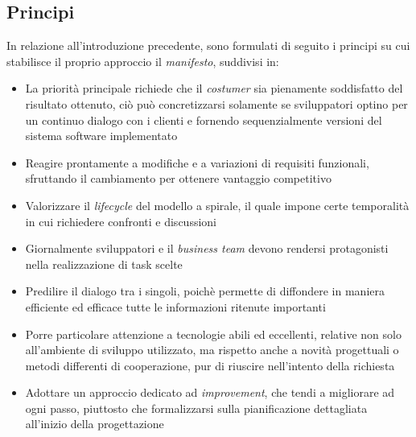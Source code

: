 \documentclass{article}
\begin{document}
\subsection*{Principi}
\large
In relazione all'introduzione precedente, sono formulati di seguito i principi su cui stabilisce il proprio approccio il \textit{manifesto}, suddivisi in:
\begin{itemize}[label={-}]
    \itemsep0em
    \item La priorità principale richiede che il \textit{costumer} sia pienamente soddisfatto del risultato ottenuto, ciò può concretizzarsi solamente se sviluppatori optino per un continuo dialogo con i clienti e fornendo sequenzialmente versioni del sistema software implementato
    \item Reagire prontamente a modifiche e a variazioni di requisiti funzionali, sfruttando il cambiamento per ottenere vantaggio competitivo
    \item Valorizzare il \textit{lifecycle} del modello a spirale, il quale impone certe temporalità in cui richiedere confronti e discussioni
    \item Giornalmente sviluppatori e il \textit{business team} devono rendersi protagonisti nella realizzazione di task scelte
    \item Predilire il dialogo tra i singoli, poichè permette di diffondere in maniera efficiente ed efficace tutte le informazioni ritenute importanti
    \item Porre particolare attenzione a tecnologie abili ed eccellenti, relative non solo all'ambiente di sviluppo utilizzato, ma rispetto anche a novità progettuali o metodi differenti di cooperazione, pur di riuscire nell'intento della richiesta
    \item Adottare un approccio dedicato ad \textit{improvement}, che tendi a migliorare ad ogni passo, piuttosto che formalizzarsi sulla pianificazione dettagliata all'inizio della progettazione
\end{itemize}
\end{document}
